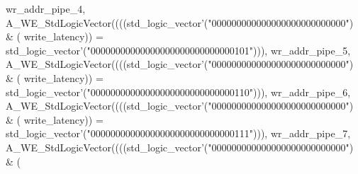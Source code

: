 \begin{DoxyCode}
{      wr_addr_pipe_4}\textcolor{vhdlchar}{,} \textcolor{vhdlchar}{A\_WE\_StdLogicVector}\textcolor{vhdlchar}{(}\textcolor{vhdlchar}{(}\textcolor{vhdlchar}{(}\textcolor{vhdlchar}{(}\textcolor{comment}{std\_logic\_vector}\textcolor{vhdlchar}{'}\textcolor{vhdlchar}{(}\textcolor{vhdllogic}{"000000000000000000000000000"}\textcolor{vhdlchar}{)} \textcolor{vhdlchar}{&} \textcolor{vhdlchar}{(}\textcolor{vhdlchar}{
      write_latency}\textcolor{vhdlchar}{)}\textcolor{vhdlchar}{)} \textcolor{vhdlchar}{=} \textcolor{comment}{std\_logic\_vector}\textcolor{vhdlchar}{'}\textcolor{vhdlchar}{(}\textcolor{vhdllogic}{"00000000000000000000000000000101"}\textcolor{vhdlchar}{)}\textcolor{vhdlchar}{)}\textcolor{vhdlchar}{)}\textcolor{vhdlchar}{,} \textcolor{vhdlchar}{
      wr_addr_pipe_5}\textcolor{vhdlchar}{,} \textcolor{vhdlchar}{A\_WE\_StdLogicVector}\textcolor{vhdlchar}{(}\textcolor{vhdlchar}{(}\textcolor{vhdlchar}{(}\textcolor{vhdlchar}{(}\textcolor{comment}{std\_logic\_vector}\textcolor{vhdlchar}{'}\textcolor{vhdlchar}{(}\textcolor{vhdllogic}{"000000000000000000000000000"}\textcolor{vhdlchar}{)} \textcolor{vhdlchar}{&} \textcolor{vhdlchar}{(}\textcolor{vhdlchar}{
      write_latency}\textcolor{vhdlchar}{)}\textcolor{vhdlchar}{)} \textcolor{vhdlchar}{=} \textcolor{comment}{std\_logic\_vector}\textcolor{vhdlchar}{'}\textcolor{vhdlchar}{(}\textcolor{vhdllogic}{"00000000000000000000000000000110"}\textcolor{vhdlchar}{)}\textcolor{vhdlchar}{)}\textcolor{vhdlchar}{)}\textcolor{vhdlchar}{,} \textcolor{vhdlchar}{
      wr_addr_pipe_6}\textcolor{vhdlchar}{,} \textcolor{vhdlchar}{A\_WE\_StdLogicVector}\textcolor{vhdlchar}{(}\textcolor{vhdlchar}{(}\textcolor{vhdlchar}{(}\textcolor{vhdlchar}{(}\textcolor{comment}{std\_logic\_vector}\textcolor{vhdlchar}{'}\textcolor{vhdlchar}{(}\textcolor{vhdllogic}{"000000000000000000000000000"}\textcolor{vhdlchar}{)} \textcolor{vhdlchar}{&} \textcolor{vhdlchar}{(}\textcolor{vhdlchar}{
      write_latency}\textcolor{vhdlchar}{)}\textcolor{vhdlchar}{)} \textcolor{vhdlchar}{=} \textcolor{comment}{std\_logic\_vector}\textcolor{vhdlchar}{'}\textcolor{vhdlchar}{(}\textcolor{vhdllogic}{"00000000000000000000000000000111"}\textcolor{vhdlchar}{)}\textcolor{vhdlchar}{)}\textcolor{vhdlchar}{)}\textcolor{vhdlchar}{,} \textcolor{vhdlchar}{
      wr_addr_pipe_7}\textcolor{vhdlchar}{,} \textcolor{vhdlchar}{A\_WE\_StdLogicVector}\textcolor{vhdlchar}{(}\textcolor{vhdlchar}{(}\textcolor{vhdlchar}{(}\textcolor{vhdlchar}{(}\textcolor{comment}{std\_logic\_vector}\textcolor{vhdlchar}{'}\textcolor{vhdlchar}{(}\textcolor{vhdllogic}{"000000000000000000000000000"}\textcolor{vhdlchar}{)} \textcolor{vhdlchar}{&} \textcolor{vhdlchar}{(}\textcolor{vhdlchar}{
}
\end{DoxyCode}
